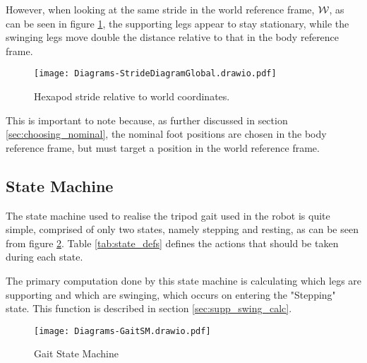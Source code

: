             \newpage
            \noindent
            However, when looking at the same stride in the world reference frame, \(\fworld\), as can be seen in figure \ref{fig:stride_world},
            the supporting legs appear to stay stationary, while the swinging legs move double the distance relative to that in the body reference frame.
            \begin{figure}[h]
                \centering
                \texttt{[image: Diagrams-StrideDiagramGlobal.drawio.pdf]}
                \caption{Hexapod stride relative to world coordinates.}
                \label{fig:stride_world}
            \end{figure}

            \noindent
            This is important to note because, as further discussed in section \ref{sec:choosing_nominal}, the nominal foot positions are chosen in the body reference frame, but must target a
            position in the world reference frame.
        
        \newpage
        \subsection{State Machine}
            The state machine used to realise the tripod gait used in the robot is quite simple, comprised of only two states, namely stepping and
            resting, as can be seen from figure \ref{fig:gaitSM}. Table \ref{tab:state_defs} defines the actions that should be taken during
            each state.

            The primary computation done by this state machine is calculating which legs are supporting and which are swinging, which occurs
            on entering the "Stepping" state. This function is described in section \ref{sec:supp_swing_calc}.

            \begin{figure}[h]
                \centering
                \texttt{[image: Diagrams-GaitSM.drawio.pdf]}
                \caption{Gait State Machine}
                \label{fig:gaitSM}
            \end{figure}


